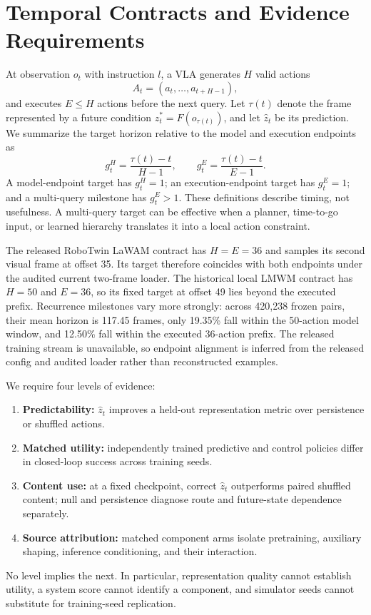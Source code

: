 \section{Temporal Contracts and Evidence Requirements}\label{sec:setup}

At observation $o_t$ with instruction $l$, a VLA generates $H$ valid actions
\begin{equation}
  A_t=(a_t,\ldots,a_{t+H-1}),
\end{equation}
and executes $E\leq H$ actions before the next query.  Let $\tau(t)$ denote the
frame represented by a future condition $z_t^*=F(o_{\tau(t)})$, and let
$\hat z_t$ be its prediction.  We summarize the target horizon relative to the
model and execution endpoints as
\begin{equation}
 g_t^H=\frac{\tau(t)-t}{H-1},\qquad
 g_t^E=\frac{\tau(t)-t}{E-1}.
\end{equation}
A model-endpoint target has $g_t^H=1$; an execution-endpoint target has
$g_t^E=1$; and a multi-query milestone has $g_t^E>1$.  These definitions
describe timing, not usefulness.  A multi-query target can be effective when a
planner, time-to-go input, or learned hierarchy translates it into a local
action constraint.

The released RoboTwin LaWAM contract has $H=E=36$ and samples its second visual
frame at offset 35.  Its target therefore coincides with both endpoints under
the audited current two-frame loader.  The historical local LMWM contract has
$H=50$ and $E=36$, so its fixed target at offset 49 lies beyond the executed
prefix.  Recurrence milestones vary more strongly: across 420,238 frozen pairs,
their mean horizon is 117.45 frames, only 19.35\% fall within the 50-action
model window, and 12.50\% fall within the executed 36-action prefix.  The
released training stream is unavailable, so endpoint alignment is inferred
from the released config and audited loader rather than reconstructed examples.

We require four levels of evidence:
\begin{enumerate}
  \item \textbf{Predictability:} $\hat z_t$ improves a held-out representation
  metric over persistence or shuffled actions.
  \item \textbf{Matched utility:} independently trained predictive and control
  policies differ in closed-loop success across training seeds.
  \item \textbf{Content use:} at a fixed checkpoint, correct $\hat z_t$
  outperforms paired shuffled content; null and persistence diagnose route and
  future-state dependence separately.
  \item \textbf{Source attribution:} matched component arms isolate
  pretraining, auxiliary shaping, inference conditioning, and their interaction.
\end{enumerate}
No level implies the next.  In particular, representation quality cannot
establish utility, a system score cannot identify a component, and simulator
seeds cannot substitute for training-seed replication.
